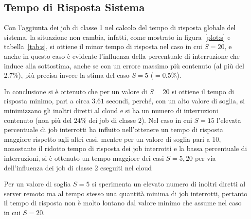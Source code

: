\subsection{Tempo di Risposta Sistema}
Con l'aggiunta dei job di classe 1 nel calcolo del tempo di risposta globale del
sistema, la situazione non cambia, infatti, come mostrato in 
figura~\ref{plot:s} e tabella~\ref{tab:s}, si ottiene il minor tempo di risposta
nel caso in cui $S=20$, e anche in questo caso è evidente l'influenza della
percentuale di interruzione che induce alla sottostima, anche se con un errore
massimo più contenuto (al più del $2.7\%$), più precisa invece la stima
del caso $S=5$ (\epsmx$=0.5\%$).

In conclusione si è ottenuto che per un valore di $S=20$ si ottiene il
tempo di risposta minimo, pari a circa $3.61$ secondi, perché, con un alto
valore di soglia, si minimizzano gli inoltri diretti al cloud e si ha un numero
di interruzioni contenuto (non più del $24\%$ dei job di classe 2).
Nel caso in cui $S=15$ l'elevata percentuale di job interrotti ha influito
nell'ottenere un tempo di risposta maggiore rispetto agli altri casi, mentre per
un valore di soglia pari a $10$, nonostante il ridotto tempo di risposta dei job
interrotti e la bassa percentuale di interruzioni, si è ottenuto un tempo
maggiore dei casi $S=5,20$ per via dell'influenza dei job di classe 2 eseguiti
nel cloud

Per un valore di soglia $S=5$ si sperimenta un
elevato numero di inoltri diretti al server remoto ma al tempo stesso una
quantità minima di job interrotti, pertanto il tempo di risposta non è molto
lontano dal valore minimo che assume nel caso in cui $S=20$.

